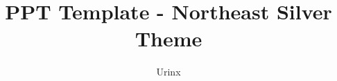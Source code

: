 \documentclass[notheorems, aspectratio=54]{beamer}
\title[Northeast Silver Theme]{PPT Template - Northeast Silver Theme}
\author{Urinx}
\institute[HUST]{mkk@hust.edu.cn}
\begin{document}
\begin{frame}
    \titlepage
\end{frame}

\end{document}
